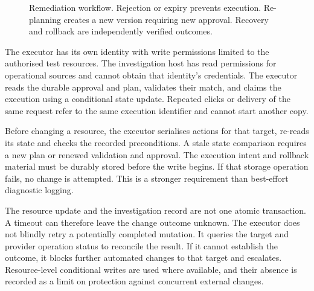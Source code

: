 \begin{figure}[htbp]
\centering
{}
\caption{Remediation workflow. Rejection or expiry prevents execution.
Re-planning creates a new version requiring new approval. Recovery and
rollback are independently verified outcomes.}
\label{fig:design:approval}
\end{figure}

The executor has its own identity with write permissions limited to the
authorised test resources. The investigation host has read permissions
for operational sources and cannot obtain that identity's credentials.
The executor reads the durable approval and plan, validates their match,
and claims the execution using a conditional state update. Repeated clicks
or delivery of the same request refer to the same execution identifier
and cannot start another copy.

Before changing a resource, the executor serialises actions for that
target, re-reads its state and checks the recorded preconditions. A stale
state comparison requires a new plan or renewed validation and approval.
The execution intent and rollback material must be durably stored before
the write begins. If that storage operation fails, no change is attempted.
This is a stronger requirement than best-effort diagnostic logging.

The resource update and the investigation record are not one atomic
transaction. A timeout can therefore leave the change outcome unknown.
The executor does not blindly retry a potentially completed mutation.
It queries the target and provider operation status to reconcile the
result. If it cannot establish the outcome, it blocks further automated
changes to that target and escalates. Resource-level conditional writes
are used where available, and their absence is recorded as a limit on
protection against concurrent external changes.


